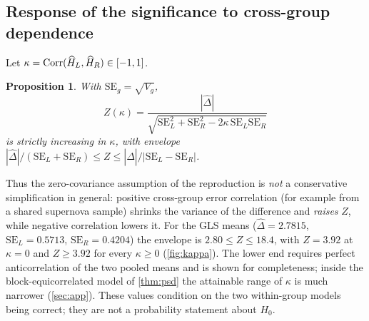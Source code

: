 \documentclass[11pt,a4paper]{article}
\newtheorem{proposition}{Proposition}
\theoremstyle{remark}\newtheorem{remark}{Remark}
\newcommand{\Hz}{H_0}\newcommand{\one}{\bm{1}}
\begin{document}
\subsection{Response of the significance to cross-group dependence}
Let $\kappa=\operatorname{Corr}(\widehat H_L,\widehat H_R)\in[-1,1]$.
\begin{proposition}\label{prop:kappa}
With $\mathrm{SE}_g=\sqrt{V_g}$,
\begin{equation}
Z(\kappa)=\frac{|\widehat\Delta|}{\sqrt{\mathrm{SE}_L^2+\mathrm{SE}_R^2-2\kappa\,\mathrm{SE}_L\mathrm{SE}_R}}
\end{equation}
is strictly increasing in $\kappa$, with envelope $|\widehat\Delta|/(\mathrm{SE}_L+\mathrm{SE}_R)\le Z\le|\widehat\Delta|/|\mathrm{SE}_L-\mathrm{SE}_R|$.
\end{proposition}
\noindent Thus the zero-covariance assumption of the reproduction is \emph{not} a conservative simplification in general: positive cross-group error correlation (for example from a shared supernova sample) shrinks the variance of the difference and \emph{raises} $Z$, while negative correlation lowers it. For the GLS means ($\widehat\Delta=2.7815$, $\mathrm{SE}_L=0.5713$, $\mathrm{SE}_R=0.4204$) the envelope is $2.80\le Z\le18.4$, with $Z=3.92$ at $\kappa=0$ and $Z\ge3.92$ for every $\kappa\ge0$ (\cref{fig:kappa}). The lower end requires perfect anticorrelation of the two pooled means and is shown for completeness; inside the block-equicorrelated model of \cref{thm:psd} the attainable range of $\kappa$ is much narrower (\cref{sec:app}). These values condition on the two within-group models being correct; they are not a probability statement about $\Hz$.
\end{document}
